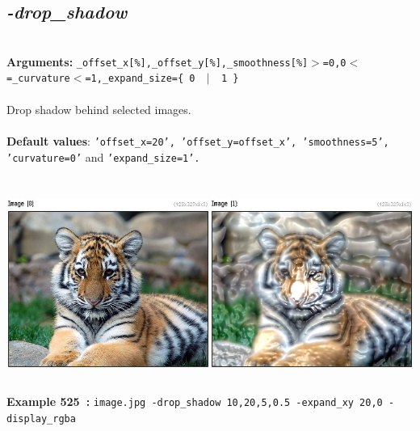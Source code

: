 \documentclass[a4paper,11pt,twoside]{book}
\begin{document}
\subsection{\emph{-drop\_shadow} }\vspace*{-0.5em}
~\\\textbf{Arguments: } 
{\small \texttt{\_offset\_x[\%],\_offset\_y[\%],\_smoothness[\%]$>$=0,0$<$=\_curvature$<$=1,\_expand\_size=\{ 0 ~$|$~ 1 \}}}\\~\\
Drop shadow behind selected images.
~\\~\\\textbf{Default values}: {\small \texttt{'offset\_x=20', 'offset\_y=offset\_x', 'smoothness=5', 'curvature=0'} and \texttt{'expand\_size=1'.}}
\begin{center}\includegraphics[keepaspectratio=true,height=7cm,width=\textwidth]{img/gmic_def525.jpg}\\
{\footnotesize \textbf{Example 525~:} \texttt{image.jpg -drop\_shadow 10,20,5,0.5 -expand\_xy 20,0 -display\_rgba}}
\end{center}
\end{document}
